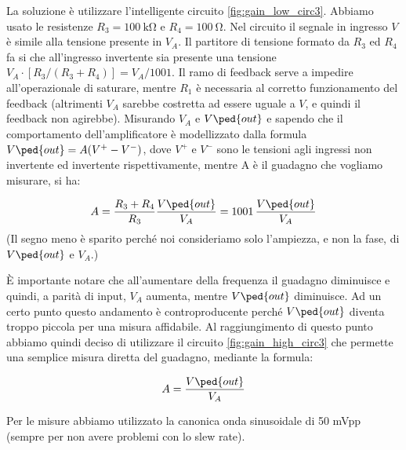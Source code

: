 La soluzione è utilizzare l'intelligente circuito \ref{fig:gain_low_circ3}. Abbiamo usato le resistenze
$R_3 = \SI{100}{\kilo\ohm}$ e $R_4 = \SI{100}{\ohm}$. Nel circuito il segnale in ingresso $V$ è simile
alla tensione presente in $V_A$. Il partitore di tensione formato da $R_3$ ed $R_4$ fa si che all'ingresso
invertente sia presente una tensione $V_A \cdot [R_3 / (R_3 + R_4)] = V_A/1001$. Il ramo di feedback serve a impedire all'operazionale di
saturare, mentre $R_1$ è necessaria al corretto funzionamento del feedback (altrimenti $V_A$ sarebbe costretta ad
essere uguale a $V$, e quindi il feedback non agirebbe). Misurando $V_A$ e $V\ped{out}$ e sapendo
che il comportamento dell'amplificatore è modellizzato dalla formula $V\ped{out} = A(V^+ - V^-)$, dove $V^+$ e $V^-$ sono
le tensioni agli ingressi non invertente ed invertente rispettivamente, mentre A è il guadagno che vogliamo
misurare, si ha:

\begin{equation}
    A = \frac{R_3 + R_4}{R_3}\frac{V\ped{out}}{V_A} = 1001\,\frac{V\ped{out}}{V_A}
\end{equation}
%
(Il segno meno è sparito perché noi consideriamo solo l'ampiezza, e non la fase, di $V\ped{out}$ e $V_A$.)

È importante notare che all'aumentare della frequenza il guadagno diminuisce e quindi, a parità
di input, $V_A$ aumenta, mentre $V\ped{out}$ diminuisce. Ad un certo punto questo andamento è controproducente
perché $V\ped{out}$ diventa troppo piccola per una misura affidabile. Al raggiungimento di questo
punto abbiamo quindi deciso di utilizzare il circuito \ref{fig:gain_high_circ3} che permette una
semplice misura diretta del guadagno, mediante la formula:

\begin{equation}
    A = \frac{V\ped{out}}{V_A}
\end{equation}

Per le misure abbiamo utilizzato la canonica onda sinusoidale di 50 mVpp (sempre per non avere
problemi con lo slew rate).